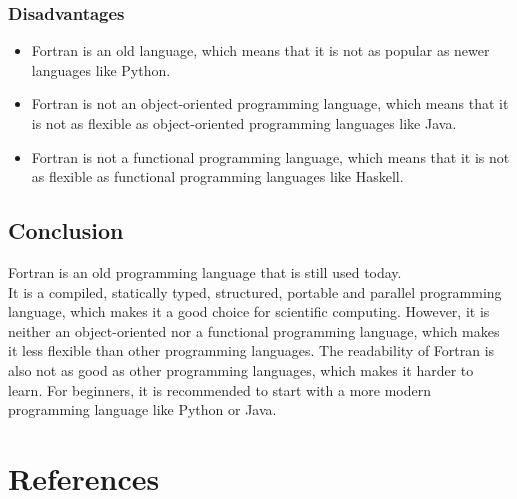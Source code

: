 \documentclass[12pt,a4paper]{scrartcl}
\begin{document}
\subsubsection{Disadvantages}
\begin{itemize}
\item Fortran is an old language, which means that it is not as popular as newer languages like Python.
\item Fortran is not an object-oriented programming language, which means that it is not as flexible as object-oriented programming languages like Java.
\item Fortran is not a functional programming language, which means that it is not as flexible as functional programming languages like Haskell.
\end{itemize}

\subsection{Conclusion}
Fortran is an old programming language that is still used today.\\
It is a compiled, statically typed, structured, portable and parallel programming language, which makes it a good choice for scientific computing. However, it is neither an object-oriented nor a functional programming language, which makes it less flexible than other programming languages.
The readability of Fortran is also not as good as other programming languages, which makes it harder to learn.
For beginners, it is recommended to start with a more modern programming language like Python or Java.\\

\section{References}
\end{document}
